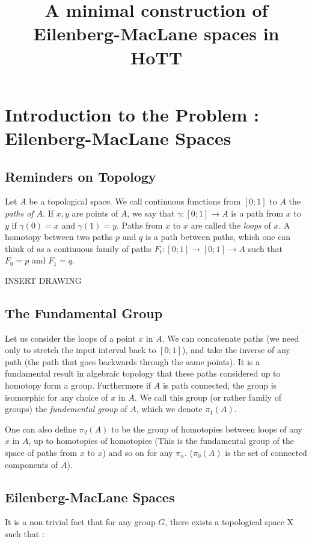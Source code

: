 \documentclass{article}
\title{A minimal construction of Eilenberg-MacLane spaces in HoTT}
\begin{document}
\tableofcontents

\section{Introduction to the Problem : Eilenberg-MacLane Spaces}

\subsection{Reminders on Topology}

Let $A$ be a topological space. We call continuous functions from $[0;1]$ to $A$ the \emph{paths of $A$}. If $x,y$ are points of $A$, we say that $\gamma : [0;1] \to A$ is a path from $x$ to $y$ if $\gamma(0) = x$ and $\gamma(1) = y$. Paths from $x$ to $x$ are called the \emph{loops} of $x$. A homotopy between two paths $p$ and $q$ is a path between paths, which one can think of as a continuous family of paths $F_{t} : [0;1] \to [0;1] \to A$ such that $F_{0} = p$ and $F_{1} = q$.

INSERT DRAWING

\subsection{The Fundamental Group}

Let us consider the loops of a point $x$ in $A$. We can concatenate paths (we need only to stretch the input interval back to $[0;1]$), and take the inverse of any path (the path that goes backwards through the same points). It is a fundamental result in algebraic topology that these paths considered up to homotopy form a group. Furthermore if $A$ is path connected, the group is isomorphic for any choice of $x$ in $A$. We call this group (or rather family of groups) the \emph{fundemental group} of $A$, which we denote $\pi_{1}(A)$.

One can also define $\pi_{2}(A)$ to be the group of homotopies between loops of any $x$ in $A$, up to homotopies of homotopies (This is the fundamental group of the space of paths from $x$ to $x$) and so on for any $\pi_{n}$. ($\pi_{0}(A)$ is the set of connected components of $A$).

\subsection{Eilenberg-MacLane Spaces}

It is a non trivial fact that for any group $G$, there exists a topological space X such that :
\end{document}
